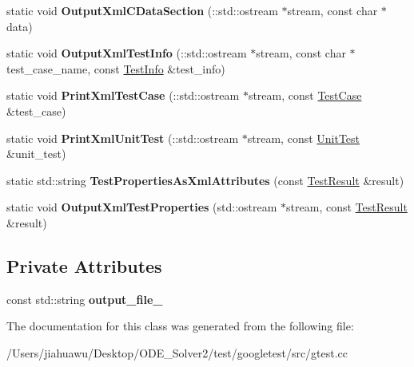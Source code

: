 \begin{DoxyCompactItemize}
\item 
\mbox{\label{classtesting_1_1internal_1_1_xml_unit_test_result_printer_a41bccd75f54932c5b3b8cce1f94dbd54}} 
static void {\bfseries Output\+Xml\+C\+Data\+Section} (\+::std\+::ostream $\ast$stream, const char $\ast$data)
\item 
\mbox{\label{classtesting_1_1internal_1_1_xml_unit_test_result_printer_af642843faed4cd28c77d688f6f2820d7}} 
static void {\bfseries Output\+Xml\+Test\+Info} (\+::std\+::ostream $\ast$stream, const char $\ast$test\+\_\+case\+\_\+name, const \mbox{\hyperlink{classtesting_1_1_test_info}{Test\+Info}} \&test\+\_\+info)
\item 
\mbox{\label{classtesting_1_1internal_1_1_xml_unit_test_result_printer_a7f7accabeac896d4271f36d24ca02dba}} 
static void {\bfseries Print\+Xml\+Test\+Case} (\+::std\+::ostream $\ast$stream, const \mbox{\hyperlink{classtesting_1_1_test_case}{Test\+Case}} \&test\+\_\+case)
\item 
\mbox{\label{classtesting_1_1internal_1_1_xml_unit_test_result_printer_a3be1c8766241d0f34cdf59b45a52f73b}} 
static void {\bfseries Print\+Xml\+Unit\+Test} (\+::std\+::ostream $\ast$stream, const \mbox{\hyperlink{classtesting_1_1_unit_test}{Unit\+Test}} \&unit\+\_\+test)
\item 
\mbox{\label{classtesting_1_1internal_1_1_xml_unit_test_result_printer_aaac4f1352a2cc46f6a69994d45999f0b}} 
static std\+::string {\bfseries Test\+Properties\+As\+Xml\+Attributes} (const \mbox{\hyperlink{classtesting_1_1_test_result}{Test\+Result}} \&result)
\item 
\mbox{\label{classtesting_1_1internal_1_1_xml_unit_test_result_printer_a69b5b7ac1b8236760790768be5ebb218}} 
static void {\bfseries Output\+Xml\+Test\+Properties} (std\+::ostream $\ast$stream, const \mbox{\hyperlink{classtesting_1_1_test_result}{Test\+Result}} \&result)
\end{DoxyCompactItemize}
\subsection*{Private Attributes}
\begin{DoxyCompactItemize}
\item 
\mbox{\label{classtesting_1_1internal_1_1_xml_unit_test_result_printer_aa81cc4540d16279f5eb5f7ec9f366ea7}} 
const std\+::string {\bfseries output\+\_\+file\+\_\+}
\end{DoxyCompactItemize}


The documentation for this class was generated from the following file\+:\begin{DoxyCompactItemize}
\item 
/\+Users/jiahuawu/\+Desktop/\+O\+D\+E\+\_\+\+Solver2/test/googletest/src/gtest.\+cc\end{DoxyCompactItemize}
